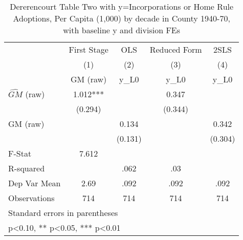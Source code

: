 \begin{table}[htbp]\centering
\def\sym#1{\ifmmode^{#1}\else\(^{#1}\)\fi}
\caption{Dererencourt Table Two with y=Incorporations or Home Rule Adoptions, Per Capita (1,000) by decade in County 1940-70, with baseline y and division FEs}
\begin{tabular}{l*{4}{c}}
\toprule
                    & First Stage   &         OLS   &Reduced Form   &        2SLS   \\
                    &\multicolumn{1}{c}{(1)}&\multicolumn{1}{c}{(2)}&\multicolumn{1}{c}{(3)}&\multicolumn{1}{c}{(4)}\\
                    &\multicolumn{1}{c}{GM  (raw)}&\multicolumn{1}{c}{y\_L0}&\multicolumn{1}{c}{y\_L0}&\multicolumn{1}{c}{y\_L0}\\
\midrule
$\hat{GM}$ (raw)    &       1.012***&               &       0.347   &               \\
                    &     (0.294)   &               &     (0.344)   &               \\
\addlinespace
GM  (raw)           &               &       0.134   &               &       0.342   \\
                    &               &     (0.131)   &               &     (0.304)   \\
\midrule
F-Stat              &       7.612   &               &               &               \\
R-squared           &               &        .062   &         .03   &               \\
Dep Var Mean        &        2.69   &        .092   &        .092   &        .092   \\
Observations        &         714   &         714   &         714   &         714   \\
\bottomrule
\multicolumn{5}{l}{\footnotesize Standard errors in parentheses}\\
\multicolumn{5}{l}{\footnotesize * p<0.10, ** p<0.05, *** p<0.01}\\
\end{tabular}
\end{table}

